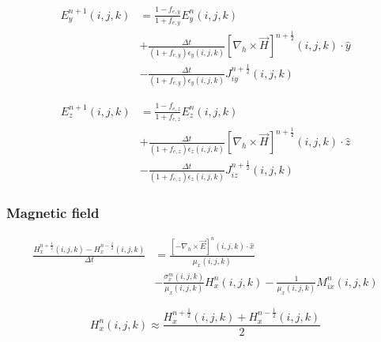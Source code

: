 \documentclass[10pt]{article}
\begin{document}
\begin{equation}
    \label{eq:yee-e-y}
	\boxed{
		\begin{aligned}
			E^{n+1}_{y}(i,j,k) & = \frac{1-f_{e,y}}{1+f_{e,y}}  E^{n}_{y}(i,j,k)                                                                                 \\
			                   & + \frac{\Delta t}{(1+f_{e,y})\epsilon_{y}(i,j,k)} \left[ \nabla_h \times \vec{H} \right]^{n+\frac{1}{2}}(i,j,k) \cdot \hat{y} \\
			                   & - \frac{\Delta t}{(1+f_{e,y})\epsilon_{y}(i,j,k)} J^{n+\frac{1}{2}}_{iy}(i,j,k)
		\end{aligned}
	}
\end{equation}

\begin{equation}
    \label{eq:yee-e-z}
	\boxed{
		\begin{aligned}
			E^{n+1}_{z}(i,j,k) & = \frac{1-f_{e,z}}{1+f_{e,z}}  E^{n}_{z}(i,j,k)                                                                                 \\
			                   & + \frac{\Delta t}{(1+f_{e,z})\epsilon_{z}(i,j,k)} \left[ \nabla_h \times \vec{H} \right]^{n+\frac{1}{2}}(i,j,k) \cdot \hat{z} \\
			                   & - \frac{\Delta t}{(1+f_{e,z})\epsilon_{z}(i,j,k)} J^{n+\frac{1}{2}}_{iz}(i,j,k)
		\end{aligned}
	}
\end{equation}



\subsubsection{Magnetic field}

\begin{equation}
	\begin{aligned}
		\frac{H^{n+\frac{1}{2}}_{x}(i,j,k) - H_{x}^{n-\frac{1}{2}}(i,j,k)}{\Delta t} & =
		\frac{\left[ -\nabla_h\times \vec{E} \right]^{n}(i,j,k) \cdot \hat{x}}{\mu_{{x}}(i,j,k)}                                                         \\
		                                                                             & - \frac{\sigma^{m}_{x}(i,j,k)}{\mu_{x}(i,j,k)} H^{n}_{x}(i,j,k)
		- \frac{1}{\mu_{x}(i,j,k)} M^{n}_{ix}(i,j,k)
	\end{aligned}
\end{equation}

\begin{equation}
	H^{n}_{x}(i,j,k) \approx \frac{H^{n+\frac{1}{2}}_{x}(i,j,k)+H^{n-\frac{1}{2}}_{x}(i,j,k)}{2}
\end{equation}
\end{document}
